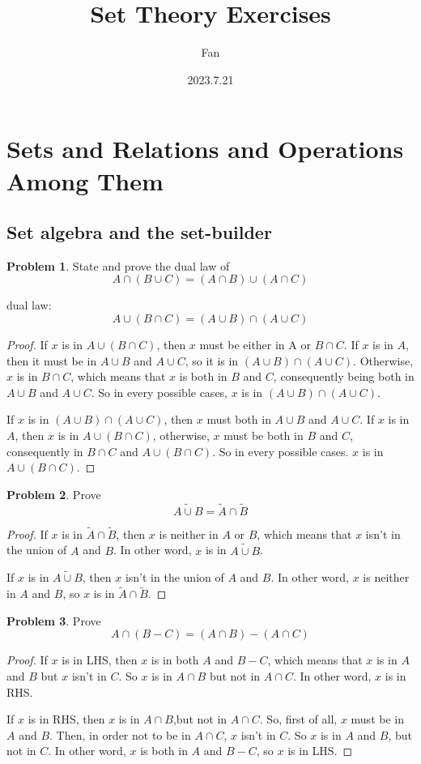 \documentclass[a4paper,11pt]{article}%
\author{Fan}
\title{Set Theory Exercises}
\date{2023.7.21}
\theoremstyle{remark}
\theoremstyle{definition}
\newtheorem{problem}{Problem}[subsection]
\begin{document}
\maketitle
\pagestyle{plain}
\tableofcontents
\printindex
\section{Sets and Relations and Operations Among Them}
\subsection{Set algebra and the set-builder}
\begin{problem}
State and prove the dual law of \[A\cap (B\cup C)=(A\cap B)\cup(A\cap C)\]

dual law:
\[A\cup(B\cap C)=(A\cup B)\cap(A\cup C)\]
\begin{proof}
If $x$ is in $A\cup (B\cap C)$, then $x$ must be either in A or $B\cap C$.
If $x$ is in $A$, then it must be in $A\cup B$ and $A\cup C$, so it is in 
$(A\cup B)\cap(A\cup C)$. Otherwise, $x$ is in $B\cap C$, which means that 
$x$ is both in $B$ and $C$, consequently being both in $A\cup B$ and $A\cup C$.
So in every possible cases, $x$ is in $(A\cup B)\cap(A\cup C)$.

If $x$ is in $(A\cup B)\cap(A\cup C)$, then $x$ must both in $A\cup B$ and 
$A\cup C$. If $x$ is in $A$, then $x$ is in $A\cup (B\cap C)$, otherwise, $x$
must be both in $B$ and $C$, consequently in $B\cap C$ and $A \cup (B \cap C)$.
So in every possible cases. $x$ is in $A\cup (B\cap C)$.

\end{proof}
\end{problem}
\begin{problem}
   Prove 
\[\widetilde{A\cup B}=\tilde{A}\cap\tilde{B} \]
\begin{proof}
    If $x$ is in $\tilde{A}\cap \tilde{B}$, then $x$ is neither in $A$ or $B$,
    which means that $x$ isn't in the union of $A$ and $B$. In other word, 
    $x$ is in $\widetilde{A\cup B}$.

    If $x$ is  in  $\widetilde{A\cup B}$, then $x$ isn't in the union of
    $A$ and $B$. In other word, $x$ is neither in $A$ and $B$, so $x$ is in 
    $\tilde{A}\cap \tilde{B}$.
\end{proof} 
\end{problem}
\begin{problem}
    Prove \[A\cap(B-C)=(A\cap B)-(A\cap C)\]
    \begin{proof}
        If $x$ is in LHS, then $x$ is in both $A$ and $B-C$, which means
        that $x$ is in $A$ and $B$ but $x$ isn't in $C$.
        So $x$ is in $A\cap B$ but not in $A\cap C$. In other word, $x$ is in
        RHS.

        If $x$ is in RHS, then $x$ is in $A\cap B$,but not in $A\cap C$. So,
        first of all, $x$ must be in $A$ and $B$. Then, in order not to be in
        $A\cap C$, $x$ isn't in $C$. So $x$ is in $A$ and $B$, but not in $C$.
        In other word, $x$ is both in $A$ and $B-C$, so $x$ is in LHS.
    \end{proof}
\end{problem}
\end{document}
